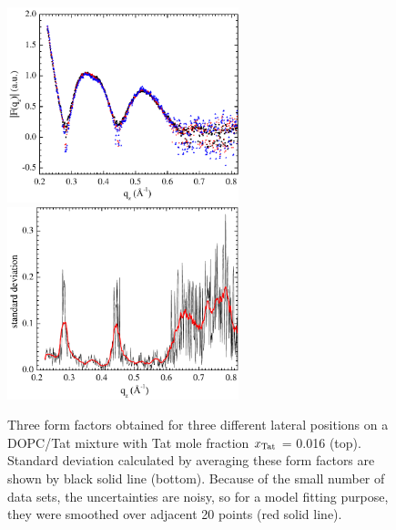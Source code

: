 \begin{figure}[htbp]
  \centering
  \includegraphics[width=0.6\textwidth]{figures/Tat/NFIT_results/three_form_factors}
  \includegraphics[width=0.6\textwidth]{figures/Tat/NFIT_results/standard_deviation}
  \caption{Three form factors obtained for three different lateral positions
  on a DOPC/Tat mixture with Tat mole fraction $x_\textrm{Tat}$ = 0.016 (top).
  Standard deviation calculated by averaging these form factors are shown
  by black solid line (bottom). Because of the small number of data sets, the 
  uncertainties are noisy, so for a model fitting purpose, they were smoothed
  over adjacent 20 points (red solid line).}
  \label{fig:form_factor_uncertainty}
\end{figure}

